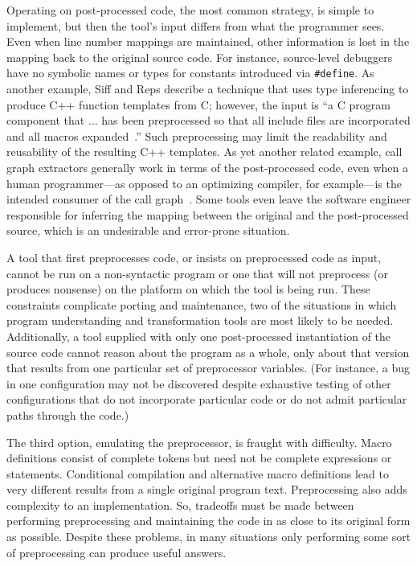 \documentclass[11pt]{article}
\begin{document}
Operating on post-processed code, the most common strategy, is simple to
implement, but then the tool's input differs from what the
programmer sees.  Even when line number mappings are maintained, other
information is lost in the mapping back to the original source code.
For instance, source-level debuggers have no symbolic names or types
for constants introduced via {\tt \#define}.  As another example, Siff
and Reps describe a technique that uses type inferencing to produce
C++ function templates from C; however, the input is ``a C program
component that $\ldots$ has been preprocessed so that all include
files are incorporated and all macros
expanded~\cite[p.~145]{Siff-fse96}.''  Such preprocessing may limit
the readability and reusability of the resulting C++ templates.  As
yet another related example, call graph extractors generally work in
terms of the post-processed code, even when a human programmer---as
opposed to an optimizing compiler, for example---is the intended
consumer of the call graph~\cite{Murphy-icse18}.  Some tools even
leave the software engineer responsible for inferring the mapping between the
original and the post-processed source, which is an undesirable and
error-prone situation.

A tool that first preprocesses code, or insists on preprocessed code as
input, cannot be run on a non-syntactic program or one that will not
preprocess (or produces nonsense) on the platform on which the tool is being
run.  These constraints complicate porting and maintenance, two of the
situations in which program understanding and transformation tools are most
likely to be needed.  Additionally, a tool supplied with only one post-processed
instantiation of the source code cannot reason about the program as a
whole, only about that version that results from one particular set of
preprocessor variables.  (For instance, a bug in one configuration may not
be discovered despite exhaustive testing of other configurations that do
not incorporate particular code or do not admit particular paths through
the code.)

The third option, emulating the preprocessor, is fraught with difficulty.
Macro definitions consist of complete tokens but need not be complete
expressions or statements.  Conditional compilation and alternative macro
definitions lead to very different results from a single original program
text.  Preprocessing also adds complexity to an implementation.  So,
tradeoffs must be made between performing preprocessing and maintaining the
code in as close to its original form as possible.  Despite these problems,
in many situations only performing some sort of preprocessing can produce
useful answers.
\end{document}
